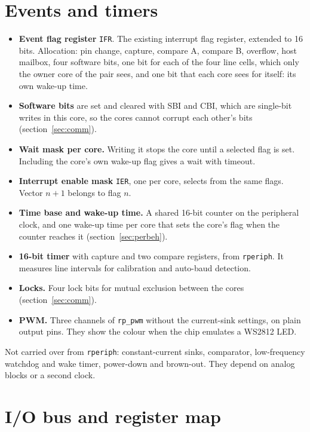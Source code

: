 \documentclass[10pt,a4paper]{article}
\newcommand{\reg}[1]{\texttt{#1}}
\begin{document}
\section{Events and timers}\label{sec:events}

\begin{itemize}
\item \textbf{Event flag register} \reg{IFR}. The existing interrupt flag register, extended to 16 bits. Allocation: pin change, capture, compare A, compare B, overflow, host mailbox, four software bits, one bit for each of the four line cells, which only the owner core of the pair sees, and one bit that each core sees for itself: its own wake-up time.
\item \textbf{Software bits} are set and cleared with SBI and CBI, which are single-bit writes in this core, so the cores cannot corrupt each other's bits (section~\ref{sec:comm}).
\item \textbf{Wait mask per core.} Writing it stops the core until a selected flag is set. Including the core's own wake-up flag gives a wait with timeout.
\item \textbf{Interrupt enable mask} \reg{IER}, one per core, selects from the same flags. Vector $n+1$ belongs to flag $n$.
\item \textbf{Time base and wake-up time.} A shared 16-bit counter on the peripheral clock, and one wake-up time per core that sets the core's flag when the counter reaches it (section~\ref{sec:perbeh}).
\item \textbf{16-bit timer} with capture and two compare registers, from \texttt{rperiph}. It measures line
intervals for calibration and auto-baud detection.
\item \textbf{Locks.} Four lock bits for mutual exclusion between the cores (section~\ref{sec:comm}).
\item \textbf{PWM.} Three channels of \texttt{rp\_pwm} without the current-sink settings, on plain output pins.
They show the colour when the chip emulates a WS2812 LED.
\end{itemize}

Not carried over from \texttt{rperiph}: constant-current sinks, comparator, low-frequency
watchdog and wake timer, power-down and brown-out. They depend on analog blocks or a second clock.

\section{I/O bus and register map}\label{sec:bus}
\end{document}
